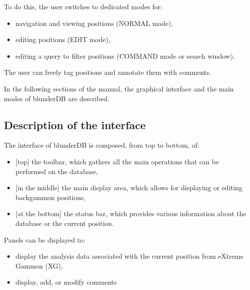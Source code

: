 \documentclass[letterpaper,10pt,english]{sphinxmanual}
\begin{document}
\sphinxAtStartPar
To do this, the user switches to dedicated modes for:
\begin{itemize}
\item {} 
\sphinxAtStartPar
navigation and viewing positions (NORMAL mode),

\item {} 
\sphinxAtStartPar
editing positions (EDIT mode),

\item {} 
\sphinxAtStartPar
editing a query to filter positions (COMMAND mode or search window).

\end{itemize}

\sphinxAtStartPar
The user can freely tag positions and annotate them with comments.

\sphinxAtStartPar
In the following sections of the manual, the graphical interface and the main modes of blunderDB are described.


\subsection{Description of the interface}
\label{\detokenize{manuel:description-de-l-interface}}
\sphinxAtStartPar
The interface of blunderDB is composed, from top to bottom, of:
\begin{itemize}
\item {} 
\sphinxAtStartPar
{[}top{]} the toolbar, which gathers all the main operations that can be performed on the database,

\item {} 
\sphinxAtStartPar
{[}in the middle{]} the main display area, which allows for displaying or editing backgammon positions,

\item {} 
\sphinxAtStartPar
{[}at the bottom{]} the status bar, which provides various information about the database or the current position.

\end{itemize}

\sphinxAtStartPar
Panels can be displayed to:
\begin{itemize}
\item {} 
\sphinxAtStartPar
display the analysis data associated with the current position from eXtreme Gammon (XG),

\item {} 
\sphinxAtStartPar
display, add, or modify comments

\end{itemize}
\end{document}
